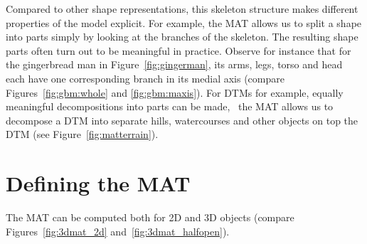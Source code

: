 Compared to other shape representations, this skeleton structure makes different properties of the model explicit.
For example, the MAT allows us to split a shape into parts simply by looking at the branches of the skeleton. 
The resulting shape parts often turn out to be meaningful in practice. 
Observe for instance that for the gingerbread man in Figure~\ref{fig:gingerman}, its arms, legs, torso and head each have one corresponding branch in its medial axis (compare Figures~\ref{fig:gbm:whole} and \ref{fig:gbm:maxis}).
For DTMs for example, equally meaningful decompositions into parts can be made, \eg\ the MAT allows us to decompose a DTM into separate hills, watercourses and other objects on top the DTM (see Figure~\ref{fig:matterrain}).

\section{Defining the MAT}
The MAT can be computed both for 2D and 3D objects (compare Figures~\ref{fig:3dmat_2d} and~\ref{fig:3dmat_halfopen}).
